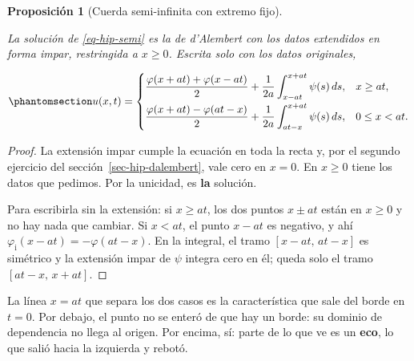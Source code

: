 \documentclass[
  spanish,
  a4paper,
]{scrbook}
\theoremstyle{definition}
\theoremstyle{plain}
\newtheorem{proposition}{Proposición}[chapter]
\theoremstyle{definition}
\theoremstyle{plain}
\theoremstyle{definition}
\theoremstyle{remark}
\begin{document}
\begin{proposition}[Cuerda semi-infinita con extremo
fijo]\protect\hypertarget{prp-hip-semi-fijo}{}\label{prp-hip-semi-fijo}

La solución de \ref{eq-hip-semi} es la de d'Alembert con los datos
extendidos en forma impar, restringida a \(x\ge0\). Escrita solo con los
datos originales,

\begin{equation}\protect\phantomsection\label{eq-hip-semi-fijo}{
u(x,t) =
\begin{cases}
\dfrac{\varphi(x+at)+\varphi(x-at)}{2} + \dfrac{1}{2a}\displaystyle\int_{x-at}^{x+at}\psi(s)\,ds, & x\ge at,\\[3mm]
\dfrac{\varphi(x+at)-\varphi(at-x)}{2} + \dfrac{1}{2a}\displaystyle\int_{at-x}^{x+at}\psi(s)\,ds, & 0\le x< at.
\end{cases}
}\end{equation}

\end{proposition}

\begin{proof}
La extensión impar cumple la ecuación en toda la recta y, por el segundo
ejercicio del sección~\ref{sec-hip-dalembert}, vale cero en \(x=0\). En
\(x\ge0\) tiene los datos que pedimos. Por la unicidad, es \textbf{la}
solución.

Para escribirla sin la extensión: si \(x\ge at\), los dos puntos
\(x\pm at\) están en \(x\ge0\) y no hay nada que cambiar. Si \(x<at\),
el punto \(x-at\) es negativo, y ahí
\(\varphi_{\text{i}}(x-at) = -\varphi(at-x)\). En la integral, el tramo
\([x-at,\,at-x]\) es simétrico y la extensión impar de \(\psi\) integra
cero en él; queda solo el tramo \([at-x,\,x+at]\).
\end{proof}

La línea \(x = at\) que separa los dos casos es la característica que
sale del borde en \(t=0\). Por debajo, el punto no se enteró de que hay
un borde: su dominio de dependencia no llega al origen. Por encima, sí:
parte de lo que ve es un \textbf{eco}, lo que salió hacia la izquierda y
rebotó.
\end{document}
